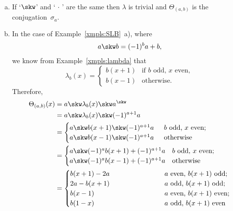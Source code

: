 \begin{xmpls}\label{xmpls:Theta}${}$
    \begin{enumerate}[a),font=\upshape]
        \item If `$\skw$' and `$\,\cdot\,$' are the same then $\lambda$ is trivial and $\Theta_{(a,b)}$ is the conjugation~$\sigma_a$.

        \item In the case of Example~\ref{xmpls:SLB}~a), where
        $$
            a\skw b = (-1)^ba + b,
        $$
        we know from Example~\ref{xmpls:lambda} that
        $$
            \lambda_b(x) = \begin{cases}
                    b(x+1) &\text{if $b$ odd, $x$ even},\\
                    b(x-1) &\text{otherwise}.
                \end{cases}
        $$
        Therefore,
        \begin{align*}
            \Theta_{(a,b)}(x) &= a\skw\lambda_b(x)\skw a^\skw\\
                &= a\skw\lambda_b(x)\skw(-1)^{a+1}a\\
                &= \begin{cases}
                    \mathrlap{a\skw b(x+1)\skw(-1)^{a+1}a}
                    \hphantom{-------------}
                        &b\text{ odd, }x\text{ even};\\
                    a\skw b(x-1)\skw(-1)^{a+1}a
                        &\text{otherwise}
                \end{cases}\\
                &= \begin{cases}
                    \mathrlap{a\skw(-1)^ab(x+1) + (-1)^{a+1}a}
                    \hphantom{-------------}
                        &b\text{ odd, }x\text{ even};\\
                    a\skw(-1)^ab(x-1) + (-1)^{a+1}a
                        &\text{otherwise}
                \end{cases}\\
                &= \begin{cases}
                    \mathrlap{b(x+1) - 2a}
                    \hphantom{-------------}
                        &\text{$a$ even, $b(x+1)$ odd;}\\
                    2a - b(x+1)
                        &\text{$a$ odd, $b(x+1)$ odd;}\\
                    b(x-1)
                        &\text{$a$ even, $b(x+1)$ even;}\\
                    b(1-x)
                        &\text{$a$ odd, $b(x+1)$ even}
                \end{cases}
        \end{align*}


\end{enumerate}
\end{xmpls}
